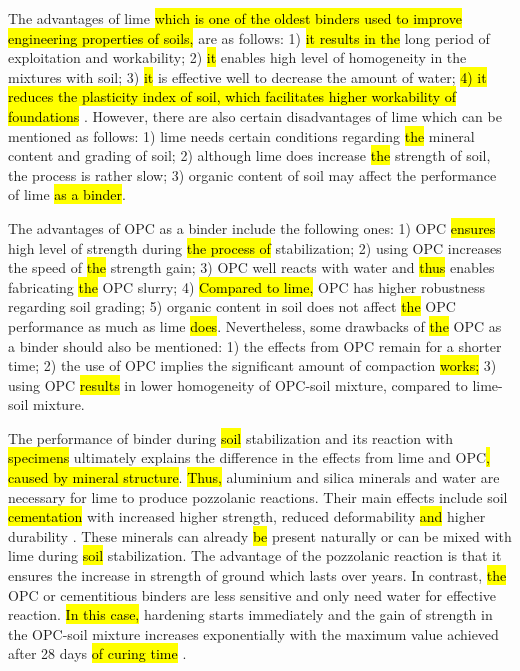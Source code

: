\documentclass[eprint,
]{actapoly}
\begin{document}
The advantages of lime \hl{which is one of the oldest binders used to improve engineering properties of soils, }are as follows: 1) \hl{it results in the }long period of exploitation and workability; 2) \hl{it }enables high level of homogeneity in the mixtures with soil; 3) \hl{it }is effective well to decrease the amount of water; \hl{4) it reduces the plasticity index of soil, which facilitates higher workability of foundations} \cite{LindhLemenkovaCEE}. However, there are also certain disadvantages of lime which can be mentioned as follows: 1) lime needs certain conditions regarding \hl{the }mineral content and grading of soil; 2) although lime does increase \hl{the }strength of soil, the process is rather slow; 3) organic content of\hl{ }soil may affect the performance of lime\hl{ as a binder}.

The advantages of OPC as a binder include the following ones: 1) OPC \hl{ensures }high level of strength during \hl{the process of }stabilization; 2) using OPC increases the speed of \hl{the }strength gain; 3) OPC well reacts with water and \hl{thus }enables fabricating \hl{the }OPC slurry; 4) \hl{Compared to lime, }OPC has higher robustness regarding soil grading; 5) organic content in soil does not affect \hl{the }OPC performance as much as lime \hl{does}. Nevertheless, some drawbacks of \hl{the }OPC as a binder should also be mentioned: 1) the effects from OPC remain for a shorter time; 2) the use of OPC implies the significant amount of compaction \hl{works;} 3) using OPC \hl{results }in lower homogeneity of OPC-soil mixture, compared to lime-soil mixture.

The performance of binder during \hl{soil }stabilization and its reaction with \hl{specimens }ultimately explains the difference in the effects from lime and OPC\hl{, caused by mineral structure}. \hl{Thus, }aluminium and silica minerals and water are necessary for lime to produce pozzolanic reactions. Their main effects include soil \hl{cementation} with increased higher strength, reduced deformability \hl{and} higher durability \citep{DISANTE2022100742,AkulaLittle,1988240,VITALE201736}. These minerals can\hl{ }already \hl{be }present naturally or can be mixed with lime during \hl{soil }stabilization. The advantage of the pozzolanic reaction is that it ensures the increase in strength of ground which lasts over years. In contrast, \hl{the }OPC or cementitious binders are less sensitive and only need water for effective reaction. \hl{In this case, }hardening starts immediately and the gain of strength in the OPC-soil mixture increases exponentially with the maximum value achieved after 28 days \hl{of curing time }\citep{Bell1995,Makusa}. 
\end{document}
